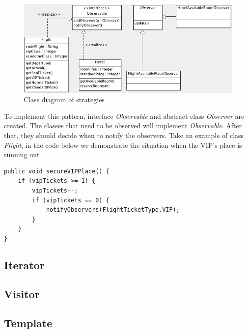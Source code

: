\begin{figure}[h]
\centering
\includegraphics[width=12cm]{project/images/observer.png}
\caption{Class diagram of strategies}
\end{figure}

To implement this pattern, interface \textit{Observable} and abstract class \textit{Observer} are created. The classes that need to be observed will implement \textit{Observable}. After that, they should decide when to notify the observers. Take an example of class \textit{Flight}, in the code below we demonstrate the situation when the VIP's place is running out

\begin{lstlisting}
public void secureVIPPlace() {
	if (vipTickets >= 1) {
		vipTickets--;
		if (vipTickets == 0) {
			notifyObservers(FlightTicketType.VIP);
		}
	}
}
\end{lstlisting}

\newpage
\subsection{Iterator}

\subsection{Visitor}

\subsection{Template}